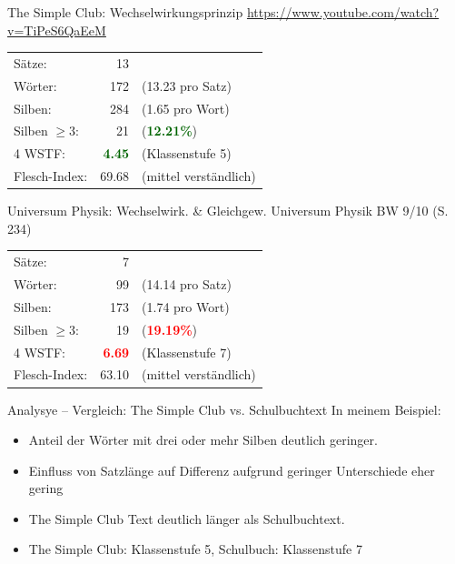 \documentclass[a4paper,10pt,
headsepline,           %
oneside,               %
pointlessnumbers,      %
bibtotoc,              %
DIV=15,               %
]{scrbook}
\begin{document}
\begin{multicols}{2}

\begin{example}{The Simple Club: Wechselwirkungsprinzip} 
    {\tiny \href{https://www.youtube.com/watch?v=TiPeS6QaEeM}{https://www.youtube.com/watch?v=TiPeS6QaEeM}} \\[0.5em]
    
    \begin{tabular}{lrl}
        Sätze:  & 13  & \\
        Wörter: & 172 & (13.23 pro Satz) \\
        Silben: & 284 & (1.65 pro Wort) \\
        Silben $\geq 3$:& 21 & (\textcolor{darkgreen}{\textbf{12.21\%}}) \\
        4 WSTF: & \textcolor{darkgreen}{\textbf{4.45}}  & (Klassenstufe 5)\\
        Flesch-Index: & 69.68 & (mittel verständlich)\\  
    \end{tabular}
\end{example}
    \columnbreak
    
    \begin{example}{Universum Physik: Wechselwirk. \& Gleichgew.} 
    {\tiny Universum Physik BW 9/10 (S. 234)}\\[0.5em]
    
    \begin{tabular}{lrl}
        Sätze: & 7    & \\
        Wörter: & 99  & (14.14 pro Satz) \\
        Silben: & 173 & (1.74 pro Wort) \\
        Silben $\geq 3$: & 19 & (\textcolor{red}{\textbf{19.19\%}}) \\
        4 WSTF: & \textcolor{red}{\textbf{6.69}} & (Klassenstufe 7)\\
        Flesch-Index: & 63.10 & (mittel verständlich)\\  
    \end{tabular}
\end{example}
    \end{multicols}

\begin{example}{Analysye -- Vergleich: The Simple Club vs. Schulbuchtext}
    In meinem Beispiel:
    \begin{itemize}
        \item Anteil der Wörter mit drei oder mehr Silben deutlich geringer.
        \item Einfluss von Satzlänge auf Differenz aufgrund geringer Unterschiede eher gering
        \item The Simple Club Text deutlich länger als Schulbuchtext.
        \item The Simple Club: Klassenstufe 5, Schulbuch: Klassenstufe 7
    \end{itemize}
\end{example}
\end{document}

